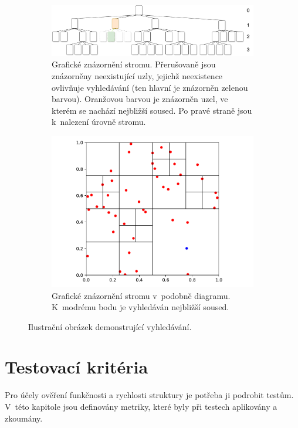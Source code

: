 \begin{figure}
\centering
\begin{subfigure}[t]{\columnwidth}
    \includegraphics[width=0.67\textheight]{obrazky-figures/hashtree/octreehash_search_treeview.drawio.pdf}
    \caption{Grafické znázornění stromu. Přerušovaně jsou znázorněny neexistující uzly, jejichž neexistence ovlivňuje vyhledávání (ten hlavní je znázorněn zelenou barvou). Oranžovou barvou je znázorněn uzel, ve  kterém se nachází nejbližší soused. Po pravé straně jsou k~nalezení úrovně stromu.}
\end{subfigure}
\hfill
\begin{subfigure}[t]{\columnwidth}
\centering
    \includegraphics[width=0.4\textheight]{obrazky-figures/hashtree/hashtree-search-octview.pdf}
    \caption{Grafické znázornění stromu v~podobně diagramu. K~modrému bodu je vyhledáván nejbližší soused.}
\end{subfigure}
    \caption{Ilustrační obrázek demonstrující vyhledávání.}
    \label{fig:vyhledávání}
\end{figure}



\section{Testovací kritéria}
Pro účely ověření funkčnosti a rychlosti struktury je potřeba ji podrobit testům. V~této kapitole jsou definovány metriky, které byly při testech aplikovány a zkoumány.

